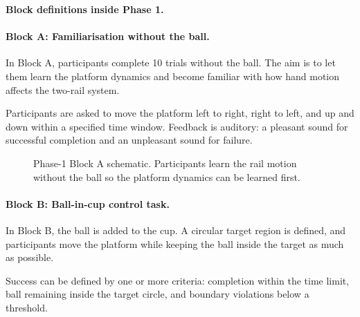 \documentclass[11pt, a4paper]{article}
\begin{document}
\textbf{Block definitions inside Phase 1.}

\paragraph{Block A: Familiarisation without the ball.}
In Block A, participants complete 10 trials without the ball. The aim is to let
them learn the platform dynamics and become familiar with how hand motion affects
the two-rail system.

Participants are asked to move the platform left to right, right to left, and
up and down within a specified time window. Feedback is auditory: a pleasant
sound for successful completion and an unpleasant sound for failure.

\begin{figure}[H]
\centering
{}
\caption{Phase-1 Block A schematic. Participants learn the rail motion without the ball so the platform dynamics can be learned first.}
\label{fig:block-a}
\end{figure}

\paragraph{Block B: Ball-in-cup control task.}
In Block B, the ball is added to the cup. A circular target region is defined,
and participants move the platform while keeping the ball inside the target as
much as possible.

Success can be defined by one or more criteria: completion within the time
limit, ball remaining inside the target circle, and boundary violations below
a threshold.
\end{document}
